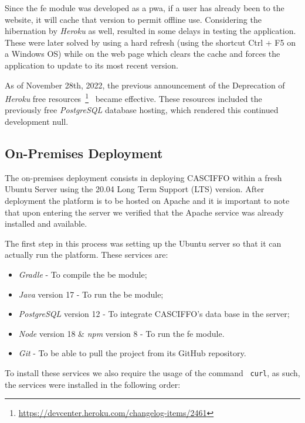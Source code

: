 Since the \acrshort{fe} module was developed as a \acrshort{pwa}, if a user has already been to the website, it will cache that version to permit offline use. Considering the hibernation by \textit{Heroku} as well, resulted in some delays in testing the application. These were later solved by using a hard refresh (using the shortcut Ctrl + F5 on a Windows OS) while on the web page which clears the cache and forces the application to update to its most recent version. 

As of November 28th, 2022, the previous announcement of the Deprecation of \textit{Heroku} free resources~\footnote{\url{https://devcenter.heroku.com/changelog-items/2461}}~\label{fn:heroku-rip-free} became effective. These resources included the previously free \textit{PostgreSQL} database hosting, which rendered this continued development null.


\subsection{On-Premises Deployment}\label{ch:impl:sec:install-deploy:ss:on-premises}


The on-premises deployment consists in deploying CASCIFFO within a fresh Ubuntu Server using the 20.04 Long Term Support (LTS) version. After deployment the platform is to be hosted on Apache and it is important to note that upon entering the server we verified that the Apache service was already installed and available. 

The first step in this process was setting up the Ubuntu server so that it can actually run the platform.
These services are:
\begin{itemize}
    \item \textit{Gradle} - To compile the \acrshort{be} module;
    \item \textit{Java} version 17 - To run the \acrshort{be} module;
    \item \textit{PostgreSQL} version 12 - To integrate CASCIFFO's data base in the server;
    \item \textit{Node} version 18 \& \textit{npm} version 8 - To run the \acrshort{fe} module.
    \item \textit{Git} - To be able to pull the project from its GitHub repository.
\end{itemize}

To install these services we also require the usage of the command ~\lstinline{curl}, as such, the services were installed in the following order:

